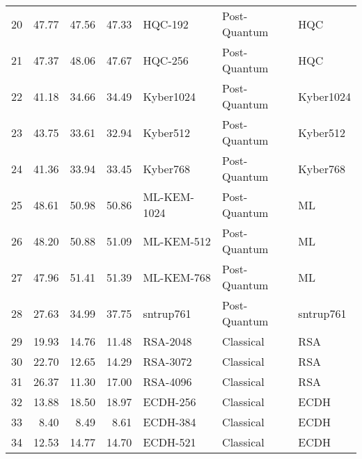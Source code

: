 \begin{table}
\begin{tabular}{lrrrlll}
20 & 47.77 & 47.56 & 47.33 & HQC-192 & Post-Quantum & HQC \\
21 & 47.37 & 48.06 & 47.67 & HQC-256 & Post-Quantum & HQC \\
22 & 41.18 & 34.66 & 34.49 & Kyber1024 & Post-Quantum & Kyber1024 \\
23 & 43.75 & 33.61 & 32.94 & Kyber512 & Post-Quantum & Kyber512 \\
24 & 41.36 & 33.94 & 33.45 & Kyber768 & Post-Quantum & Kyber768 \\
25 & 48.61 & 50.98 & 50.86 & ML-KEM-1024 & Post-Quantum & ML \\
26 & 48.20 & 50.88 & 51.09 & ML-KEM-512 & Post-Quantum & ML \\
27 & 47.96 & 51.41 & 51.39 & ML-KEM-768 & Post-Quantum & ML \\
28 & 27.63 & 34.99 & 37.75 & sntrup761 & Post-Quantum & sntrup761 \\
29 & 19.93 & 14.76 & 11.48 & RSA-2048 & Classical & RSA \\
30 & 22.70 & 12.65 & 14.29 & RSA-3072 & Classical & RSA \\
31 & 26.37 & 11.30 & 17.00 & RSA-4096 & Classical & RSA \\
32 & 13.88 & 18.50 & 18.97 & ECDH-256 & Classical & ECDH \\
33 & 8.40 & 8.49 & 8.61 & ECDH-384 & Classical & ECDH \\
34 & 12.53 & 14.77 & 14.70 & ECDH-521 & Classical & ECDH \\
\bottomrule
\end{tabular}
\end{table}
